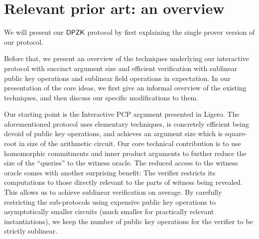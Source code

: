 \section{Relevant prior art: an overview} 
We will present our $\mathsf{DPZK}$ protocol \dpname{} by first explaining the single prover version of our protocol. 

Before that, we present an overview of the techniques underlying our interactive protocol
with succinct argument size and efficient verification with sublinear public
key operations and sublinear field operations in expectation. In our
presentation of the core ideas, we first give an informal overview of the
existing techniques, and then discuss our specific modifications to them.

Our starting point is the Interactive PCP argument presented in Ligero\cite{Ligero2017}. The
aforementioned protocol uses elementary techniques, is concretely
efficient being devoid of public key operations, and achieves an argument
size which is square-root in size of the arithmetic circuit. Our core technical
contribution is to use homomorphic commitments and inner product arguments to 
further reduce the size of the ``queries'' to the witness oracle. The
reduced access to the witness oracle comes with another surprising benefit: The
verifier restricts its computations to those directly relevant to the parts of
witness being revealed. This allows us to achieve sublinear verification on
average. By carefully restricting the sub-protocols using expensive public key
operations to asymptotically smaller circuits (much smaller for practically
relevant instantiations), we keep the number of public key operations for the
verifier to be strictly sublinear.
    
